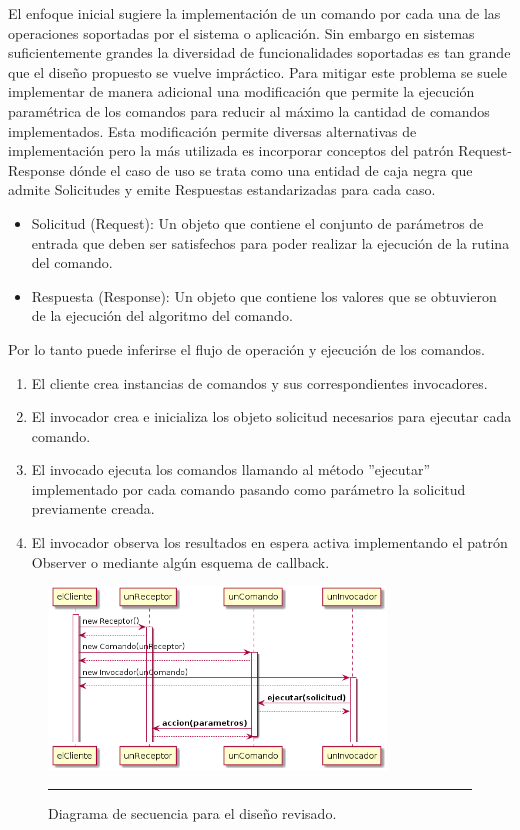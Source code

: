 El enfoque inicial sugiere la implementación de un comando
por cada una de las operaciones soportadas por el sistema o aplicación. Sin embargo en sistemas suficientemente grandes la diversidad de funcionalidades soportadas es tan grande que el diseño propuesto se vuelve impráctico.
Para mitigar este problema se suele implementar de manera adicional una modificación que permite la ejecución paramétrica de los comandos para reducir al máximo la cantidad de comandos implementados.
Esta modificación permite diversas alternativas de implementación pero la más utilizada es incorporar conceptos del patrón Request-Response dónde el caso de uso se trata como una entidad de caja negra que admite Solicitudes y emite Respuestas estandarizadas para cada caso.
\begin{itemize}
	\item Solicitud (Request): Un objeto que contiene el conjunto de parámetros de entrada que deben ser satisfechos para poder realizar la ejecución de la rutina del comando.
	\item Respuesta (Response): Un objeto que contiene los valores que se obtuvieron de la ejecución del algoritmo del comando.
\end{itemize}

Por lo tanto puede inferirse el flujo de operación y ejecución de los comandos.

\begin{enumerate}
	\item El cliente crea instancias de comandos y sus correspondientes invocadores. 
	\item El invocador crea e inicializa los objeto solicitud necesarios para ejecutar cada comando.
	\item El invocado ejecuta los comandos llamando al método ''ejecutar'' implementado por cada comando pasando como parámetro la solicitud previamente creada.
	\item El invocador observa los resultados en espera activa implementando el patrón Observer o mediante algún esquema de callback.
\end{enumerate}

\begin{figure}[htbp]
	\centering
	\includegraphics[width=0.8\textwidth]{Figures/uml_sequence_commander_req_resp.png}
	\rule{35em}{1pt}
	\caption[Commander Review]{Diagrama de secuencia para el diseño revisado.}
	\label{fig:uml_commander_sequence_req_resp}
\end{figure}

